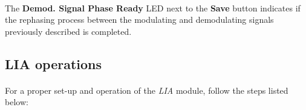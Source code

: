 \paragraph{} The \textbf{Demod. Signal Phase Ready} LED next to the \textbf{Save} button indicates if the rephasing process between the modulating and demodulating signals previously described is completed.





\subsection{LIA operations}
\paragraph{}For a proper set-up and operation of the \textit{LIA} module, follow the steps listed below:

